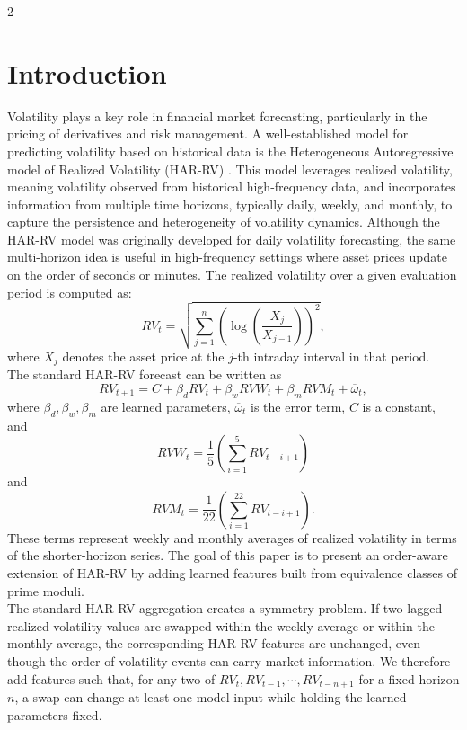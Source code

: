 ﻿\documentclass[a4paper]{article}
\begin{document}
\begin{multicols}{2}
\setlength{\columnsep}{0.5cm}

\section{Introduction}
\vspace{0.3cm}
\noindent
Volatility plays a key role in financial market forecasting, particularly in the pricing of derivatives and risk management. A well-established model for predicting volatility based on historical data is the Heterogeneous Autoregressive model of Realized Volatility (HAR-RV) \cite{corsi2009}. This model leverages realized volatility, meaning volatility observed from historical high-frequency data, and incorporates information from multiple time horizons, typically daily, weekly, and monthly, to capture the persistence and heterogeneity of volatility dynamics. Although the HAR-RV model was originally developed for daily volatility forecasting, the same multi-horizon idea is useful in high-frequency settings where asset prices update on the order of seconds or minutes. The realized volatility over a given evaluation period is computed as:
\[
RV_t = \sqrt{\sum_{j=1}^n \left(\log\left(\frac{X_j}{X_{j-1}}\right)\right)^2},
\]
where $X_j$ denotes the asset price at the $j$-th intraday interval in that period.
\vspace{0.3cm}
\\ The standard HAR-RV forecast can be written as $$RV_{t+1} = C + \beta_d RV_t + \beta_wRVW_t + \beta_m RVM_t + \overline{\omega}_t,$$ where $\beta_d, \beta_w, \beta_m$ are learned parameters, $\overline{\omega}_t$ is the error term, $C$ is a constant, and $$RVW_t = \frac15\left(\sum_{i=1}^5 RV_{t-i+1}\right)$$ and $$RVM_t = \frac1{22}\left(\sum_{i=1}^{22} RV_{t-i+1}\right).$$ These terms represent weekly and monthly averages of realized volatility in terms of the shorter-horizon series. The goal of this paper is to present an order-aware extension of HAR-RV by adding learned features built from equivalence classes of prime moduli.
\vspace{0.3cm}
\\ The standard HAR-RV aggregation creates a symmetry problem. If two lagged realized-volatility values are swapped within the weekly average or within the monthly average, the corresponding HAR-RV features are unchanged, even though the order of volatility events can carry market information. We therefore add features such that, for any two of $RV_t, RV_{t-1}, \cdots, RV_{t-n+1}$ for a fixed horizon $n$, a swap can change at least one model input while holding the learned parameters fixed.

\end{multicols}
\end{document}

